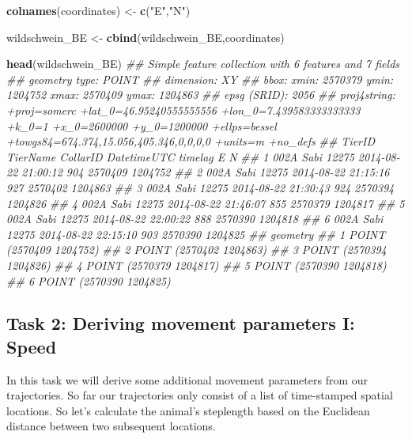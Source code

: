 \documentclass[]{book}
\newenvironment{Shaded}{\begin{snugshade}}{\end{snugshade}}
\newcommand{\CommentTok}[1]{\textcolor[rgb]{0.56,0.35,0.01}{\textit{#1}}}
\newcommand{\KeywordTok}[1]{\textcolor[rgb]{0.13,0.29,0.53}{\textbf{#1}}}
\newcommand{\NormalTok}[1]{#1}
\newcommand{\StringTok}[1]{\textcolor[rgb]{0.31,0.60,0.02}{#1}}
\begin{document}
\begin{Shaded}
\begin{Highlighting}[]
\KeywordTok{colnames}\NormalTok{(coordinates) <-}\StringTok{ }\KeywordTok{c}\NormalTok{(}\StringTok{"E"}\NormalTok{,}\StringTok{"N"}\NormalTok{)}

\NormalTok{wildschwein_BE <-}\StringTok{ }\KeywordTok{cbind}\NormalTok{(wildschwein_BE,coordinates)}

\KeywordTok{head}\NormalTok{(wildschwein_BE)}
\CommentTok{## Simple feature collection with 6 features and 7 fields}
\CommentTok{## geometry type:  POINT}
\CommentTok{## dimension:      XY}
\CommentTok{## bbox:           xmin: 2570379 ymin: 1204752 xmax: 2570409 ymax: 1204863}
\CommentTok{## epsg (SRID):    2056}
\CommentTok{## proj4string:    +proj=somerc +lat_0=46.95240555555556 +lon_0=7.439583333333333 +k_0=1 +x_0=2600000 +y_0=1200000 +ellps=bessel +towgs84=674.374,15.056,405.346,0,0,0,0 +units=m +no_defs}
\CommentTok{##   TierID TierName CollarID         DatetimeUTC timelag       E       N}
\CommentTok{## 1   002A     Sabi    12275 2014-08-22 21:00:12     904 2570409 1204752}
\CommentTok{## 2   002A     Sabi    12275 2014-08-22 21:15:16     927 2570402 1204863}
\CommentTok{## 3   002A     Sabi    12275 2014-08-22 21:30:43     924 2570394 1204826}
\CommentTok{## 4   002A     Sabi    12275 2014-08-22 21:46:07     855 2570379 1204817}
\CommentTok{## 5   002A     Sabi    12275 2014-08-22 22:00:22     888 2570390 1204818}
\CommentTok{## 6   002A     Sabi    12275 2014-08-22 22:15:10     903 2570390 1204825}
\CommentTok{##                  geometry}
\CommentTok{## 1 POINT (2570409 1204752)}
\CommentTok{## 2 POINT (2570402 1204863)}
\CommentTok{## 3 POINT (2570394 1204826)}
\CommentTok{## 4 POINT (2570379 1204817)}
\CommentTok{## 5 POINT (2570390 1204818)}
\CommentTok{## 6 POINT (2570390 1204825)}
\end{Highlighting}
\end{Shaded}

\hypertarget{task-2-deriving-movement-parameters-i-speed}{%
\subsection{Task 2: Deriving movement parameters I: Speed}\label{task-2-deriving-movement-parameters-i-speed}}

In this task we will derive some additional movement parameters from our trajectories. So far our trajectories only consist of a list of time-stamped spatial locations. So let's calculate the animal's steplength based on the Euclidean distance between two subsequent locations.
\end{document}
